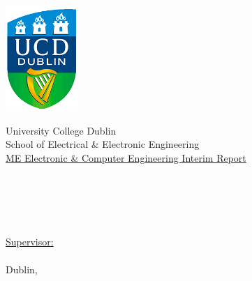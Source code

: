 
\begin{titlepage}
\centering
\includegraphics[height=4cm]{Figures/ucd_logo.png} \\
\begin{doublespacing}
\LARGE
University College Dublin \\
\Large
School of Electrical \& Electronic Engineering \\
\large
\underline{ME Electronic \& Computer Engineering Interim Report}
\end{doublespacing}


\huge
\textbf{\doctitle \\}
\begin{singlespacing}
    \Large
    \authorone \\
    \sauthorone \\
\end{singlespacing}
\vfill
\large
\underline{Supervisor:} \\
\firstCommitteeMember \\



\large
Dublin, \monthYear \\


\end{titlepage} 
\clearpage
